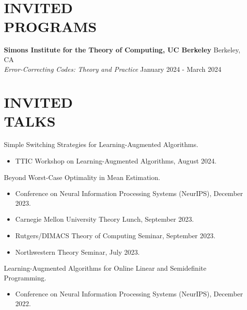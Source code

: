 \documentclass[margin, 10pt]{res-short} %
\begin{document}
\begin{resume}
\section{INVITED \\ PROGRAMS}

{\bf Simons Institute for the Theory of Computing, UC Berkeley} \hfill Berkeley, CA \\
\emph{Error-Correcting Codes: Theory and Practice} \hfill January 2024 - March 2024 

\section{INVITED \\ TALKS}

Simple Switching Strategies for Learning-Augmented Algorithms.
\begin{itemize}
    \item TTIC Workshop on Learning-Augmented Algorithms, August 2024.
\end{itemize}

Beyond Worst-Case Optimality in Mean Estimation.
\begin{itemize}
    \item Conference on Neural Information Processing Systems (NeurIPS), December 2023.
    \item Carnegie Mellon University Theory Lunch, September 2023.
    \item Rutgers/DIMACS Theory of Computing Seminar, September 2023.
    \item Northwestern Theory Seminar, July 2023.
\end{itemize}

Learning-Augmented Algorithms for Online Linear and Semidefinite Programming.
\begin{itemize}
\item Conference on Neural Information Processing Systems (NeurIPS), December 2022.
\end{itemize}


\end{resume}
\end{document}
